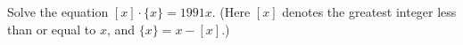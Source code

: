 Solve the equation $[x] \cdot \{x\} = 1991x$. (Here $[x]$ denotes the greatest integer less than or equal to $x$,  and $\{x\}=x-[x]$.)